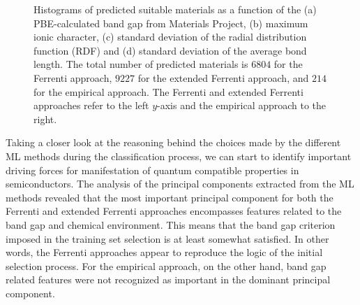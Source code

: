\documentclass[superscriptaddress,unsortedaddress,
 amsmath,amssymb,
 aps,
]{revtex4-2}
\begin{document}
\begin{figure}[ht]
    \begin{subfigure}[b]{1\textwidth}
    \centering
    
  \end{subfigure}
  \par\bigskip
\begin{subfigure}[b]{0.45\textwidth}
    
    \subcaption{}
\end{subfigure}
\begin{subfigure}[b]{0.45\textwidth}
    
    \subcaption{}
\end{subfigure}%

\begin{subfigure}[b]{0.45\textwidth}
    
    \subcaption{}
\end{subfigure}
\begin{subfigure}[b]{0.45\textwidth}
    
    \subcaption{}
\end{subfigure}
\caption{Histograms of predicted suitable materials as a function of the (a) PBE-calculated band gap from Materials Project, (b) maximum ionic character, (c) standard deviation of the radial distribution function (RDF) and (d) standard deviation of the average bond length. The total number of predicted materials is  $6804$ for the Ferrenti approach, $9227$ for the extended Ferrenti approach, and $214$ for the empirical approach. The Ferrenti and extended Ferrenti approaches refer to the left $y$-axis and the empirical approach to the right.
    }
\label{fig:histogram_new}
\end{figure}

Taking a closer look at the reasoning behind the choices made by the different ML methods during the classification process, we can start to identify important driving forces for manifestation of quantum compatible properties in semiconductors. 
The analysis of the principal components extracted from the ML methods revealed that the most important principal component for both the Ferrenti and extended Ferrenti approaches encompasses features related to the band gap and chemical environment. This means that the band gap criterion imposed in the training set selection is at least somewhat satisfied. In other words, the Ferrenti approaches appear to reproduce the logic of the initial selection process. For the empirical approach, on the other hand, band gap related features were not recognized as important in the dominant principal component. 
\end{document}

